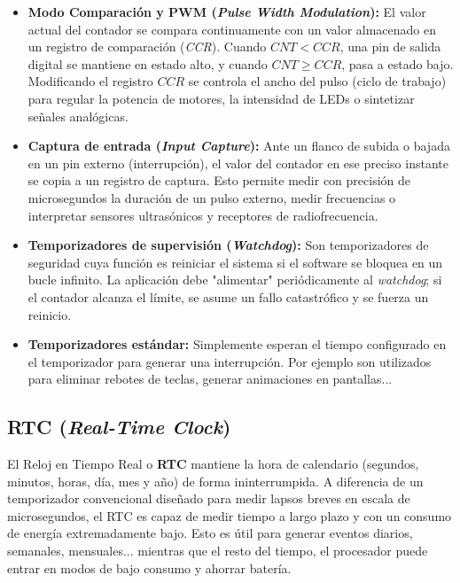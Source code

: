 \documentclass[../main.tex]{subfiles}
\begin{document}
        \begin{itemize}
            \item \textbf{Modo Comparación y PWM (\emph{Pulse Width Modulation}):} El valor actual del contador se compara continuamente con un valor almacenado en un registro de comparación (\emph{CCR}). Cuando $CNT < CCR$, una pin de salida digital se mantiene en estado alto, y cuando $CNT \ge CCR$, pasa a estado bajo. Modificando el registro $CCR$ se controla el ancho del pulso (ciclo de trabajo) para regular la potencia de motores, la intensidad de LEDs o sintetizar señales analógicas.
            \item \textbf{Captura de entrada (\emph{Input Capture}):} Ante un flanco de subida o bajada en un pin externo (interrupción), el valor del contador en ese preciso instante se copia  a un registro de captura. Esto permite medir con precisión de microsegundos la duración de un pulso externo, medir frecuencias o interpretar sensores ultrasónicos y receptores de radiofrecuencia.
            \item \textbf{Temporizadores de supervisión (\emph{Watchdog}):} Son temporizadores de seguridad cuya función es reiniciar el sistema si el software se bloquea en un bucle infinito. La aplicación debe "alimentar" periódicamente al \emph{watchdog}; si el contador alcanza el límite, se asume un fallo catastrófico y se fuerza un reinicio.
            \item \textbf{Temporizadores estándar:} Simplemente esperan el tiempo configurado en el temporizador para generar una interrupción. Por ejemplo son utilizados para eliminar rebotes de teclas, generar animaciones en pantallas...
        \end{itemize}

    \subsection{RTC (\emph{Real-Time Clock})}

        El Reloj en Tiempo Real o \textbf{RTC} mantiene la hora de calendario (segundos, minutos, horas, día, mes y año) de forma ininterrumpida. A diferencia de un temporizador convencional diseñado para medir lapsos breves en escala de microsegundos, el RTC es capaz de medir tiempo a largo plazo y con un consumo de energía extremadamente bajo. Esto es útil para generar eventos diarios, semanales, mensuales... mientras que el resto del tiempo, el procesador puede entrar en modos de bajo consumo y ahorrar batería.
\end{document}
